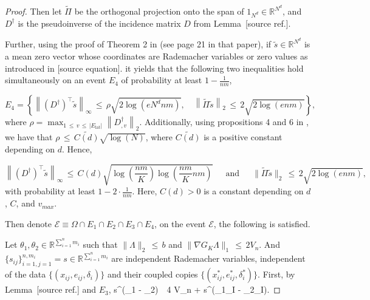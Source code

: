 \documentclass[twoside,11pt]{article}
\makeatletter
\newcommand{\discardlabel}[1]{}
\newcommand{\discardtwo}[2]{}
\newcommand{\legacyref}[1]{\textup{[source ref.]}}
\newcommand{\legacyeqref}[1]{\textup{[source equation]}}
\newenvironment{legacycomparison}{%
  \begingroup\color{legacygray}%
  \let\label\discardlabel
  \let\originallabel\discardlabel
  \let\ref\legacyref
  \let\pageref\legacyref
  \let\eqref\legacyeqref
  \let\cref\legacyref
  \let\Cref\legacyref
  \let\autoref\legacyref
  \let\aliasref\discardtwo
}{\endgroup}
\newcommand{\aliasref}[2]{%
  \@ifundefined{r@#2}{}{%
    \expandafter\let\csname r@#1\expandafter\endcsname\csname r@#2\endcsname}}
\makeatother
\begin{document}
\begin{legacycomparison}
\begin{proof}
Then let \(\tilde \Pi\) be the orthogonal projection onto the span of \(1_{N^d} \in \mathbb{R}^{N^d}\), and \(D^\dag\) is the pseudoinverse of the incidence matrix \(D\) from Lemma~\ref{lemma_15}.


Further, using the proof of Theorem 2 in \cite{hutter2016optimal} (see page 21 in that paper), if \(\tilde s \in \mathbb{R}^{N^d}\) is a mean zero vector whose coordinates are Rademacher variables or zero values as introduced in \eqref{tilde_s}. it yields that the following two inequalities hold simultaneously on an event \(E_4\) of probability at least   \(1 - \frac{1}{nm}\),


\[
E_4 = \left\{ \left\| (D^\dag)^\top \tilde s\right\|_{\infty} \,\leq\,  \rho \sqrt{2\log(eN^d nm)}, \quad \left\| \tilde \Pi \tilde s \right\|_2 \,\leq\, 2\sqrt{2\log(enm)} \right\},
\]
where \(\rho = \max_{1 \,\leq\, v \,\leq\, |E_{\text{lat}}|} \left\| D^\dag_{,v} \right\|_2\). Additionally, using propositions 4 and 6 in \cite{hutter2016optimal}, we have that \(\rho \,\leq\, \widetilde{C(d)} \sqrt{\log(N)}\), where \( \widetilde{C(d)}\) is a positive constant depending on \(d\). Hence,

\[
\left\| (D^\dag)^\top \tilde s\right\|_{\infty} \,\leq\,  C(d) \sqrt{\log\left(\frac{nm}{K}\right) \log\left(\frac{nm}{K} nm\right)} \quad \,\,\,\text{and}\,\,\, \quad \|\tilde \Pi \tilde s\|_2 \,\leq\, 2\sqrt{2\log(enm)},
\]
with probability at least \(1 - 2 \cdot \frac{1}{nm}\). Here, \(C(d) > 0\) is a constant depending on \(d\), \(C\), and \(v_{max}\).


Then denote $\mathcal{E} \equiv \Omega \cap E_1 \cap E_2 \cap E_3 \cap E_4$, on the event $\mathcal{E}$, the following is satisfied. 

Let \(\theta_1,\theta_2 \in \mathbb{R}^{\sum_{i = 1}^n   m_i}\) such that \(\|\varLambda\|_2 \,\leq\, b\) and \(\|\nabla{G_K} \varLambda\|_1 \,\leq\, 2V_n\). And \(\{s_{ij}\}^{n,m_i}_{i=1,j=1} = s\in \mathbb{R}^{\sum_{i = 1}^n   m_i}\) are independent Rademacher variables, independent of the data $\{(x_{ij}, e_{ij}, \delta_i)\}$ and their coupled copies $\{(x_{ij}^*, e_{ij}^*, \delta_i^*)\}$.
First, by Lemma~\ref{lemma_16} and \(E_3\), 
\bea
s^\top(\theta_1 - \theta_2) \,\leq\, 4 V_n + s^\top({\theta_1}_I - {\theta_2}_I).
\bea 


\end{proof}
\end{legacycomparison}
\end{document}
